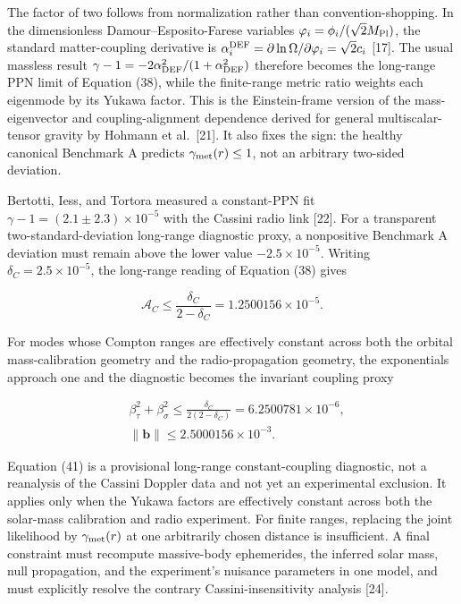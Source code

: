 \documentclass[
  american,
  11pt,
  letterpaper,
]{article}
\begin{document}
The factor of two follows from normalization rather than convention-shopping. In the dimensionless Damour--Esposito-Farese variables \(\varphi_i=\phi_i/(\sqrt2M_{\rm Pl})\), the standard matter-coupling derivative is \(\alpha_i^{\rm DEF}=\partial\ln\Omega/\partial\varphi_i=\sqrt2c_i\) {[}17{]}. The usual massless result \(\gamma-1=-2\alpha_{\rm DEF}^2/(1+\alpha_{\rm DEF}^2)\) therefore becomes the long-range PPN limit of Equation (38), while the finite-range metric ratio weights each eigenmode by its Yukawa factor. This is the Einstein-frame version of the mass-eigenvector and coupling-alignment dependence derived for general multiscalar-tensor gravity by Hohmann et al.~{[}21{]}. It also fixes the sign: the healthy canonical Benchmark A predicts \(\gamma_{\rm met}(r)\leq1\), not an arbitrary two-sided deviation.

Bertotti, Iess, and Tortora measured a constant-PPN fit \(\gamma-1=(2.1\pm2.3)\times10^{-5}\) with the Cassini radio link {[}22{]}. For a transparent two-standard-deviation long-range diagnostic proxy, a nonpositive Benchmark A deviation must remain above the lower value \(-2.5\times10^{-5}\). Writing \(\delta_C=2.5\times10^{-5}\), the long-range reading of Equation (38) gives

\begin{equation}
\mathcal A_C
\leq \frac{\delta_C}{2-\delta_C}
=1.2500156\times10^{-5}.
\tag{40}
\end{equation}

For modes whose Compton ranges are effectively constant across both the orbital mass-calibration geometry and the radio-propagation geometry, the exponentials approach one and the diagnostic becomes the invariant coupling proxy

\begin{equation}
\begin{aligned}
& \beta_\tau^2+\beta_\sigma^2
\leq\frac{\delta_C}{2(2-\delta_C)}
=6.2500781\times10^{-6}, \\
& \|\mathbf b\|\leq2.5000156\times10^{-3}.
\end{aligned}
\tag{41}
\end{equation}

Equation (41) is a provisional long-range constant-coupling diagnostic, not a reanalysis of the Cassini Doppler data and not yet an experimental exclusion. It applies only when the Yukawa factors are effectively constant across both the solar-mass calibration and radio experiment. For finite ranges, replacing the joint likelihood by \(\gamma_{\rm met}(r)\) at one arbitrarily chosen distance is insufficient. A final constraint must recompute massive-body ephemerides, the inferred solar mass, null propagation, and the experiment's nuisance parameters in one model, and must explicitly resolve the contrary Cassini-insensitivity analysis {[}24{]}.
\end{document}
